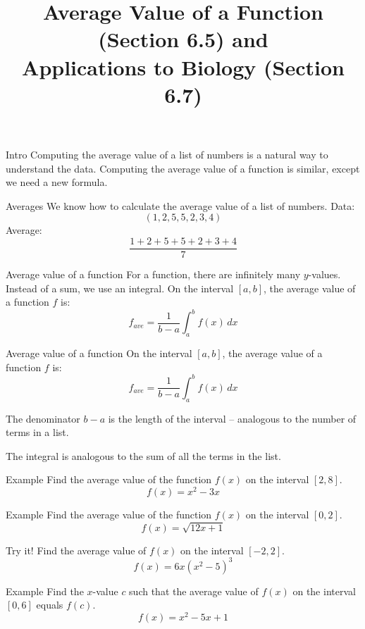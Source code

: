 \documentclass[t]{beamer}
\title{Average Value of a Function (Section 6.5) and \\
Applications to Biology (Section 6.7)}
\date{}
\begin{document}
\frame{\titlepage}

\begin{frame}{Intro}
Computing the average value of a list of numbers is a 
natural way to understand the data.  Computing the
average value of a function is similar, except we need
a new formula.
\end{frame}

\begin{frame}{Averages}
We know how to calculate the average value of a list of numbers.
Data: 
$$(1,2,5,5,2,3,4)$$
Average:
$$\frac{1 + 2 + 5 + 5 + 2 + 3 + 4}{7}$$
\end{frame}

\begin{frame}{Average value of a function}
For a function, there are infinitely many $y$-values. Instead of a 
sum, we use an integral.  On the interval $[a,b]$, the average 
value of a function $f$ is:
$$f_{ave} = \frac{1}{b - a} \int_a^b f(x) \, dx$$
\end{frame}

\begin{frame}{Average value of a function}
On the interval $[a,b]$, the average 
value of a function $f$ is:
$$f_{ave} = \frac{1}{b - a} \int_a^b f(x) \, dx$$

The denominator $b - a$ is the length of the interval -- analogous to the
number of terms in a list.

The integral is analogous to the sum of all the terms in the list.
\end{frame}

\begin{frame}{Example}
Find the average value of the function $f(x)$ on the interval $[2,8]$.
$$f(x) = x^2 - 3x$$
\end{frame}

\begin{frame}{Example}
Find the average value of the function $f(x)$ on the interval $[0,2]$.
$$f(x) = \sqrt{12x + 1}$$
\end{frame}

\begin{frame}{Try it!}
Find the average value of $f(x)$ on the interval $[-2,2]$.
$$f(x) = 6x (x^2-5)^3$$
\end{frame}

\begin{frame}{Example}
Find the $x$-value $c$ such that the average value of $f(x)$
on the interval $[0,6]$ equals $f(c)$.
$$f(x) = x^2 - 5x + 1 $$
\end{frame}
\end{document}
